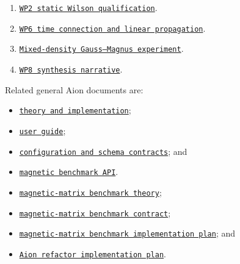 \documentclass[11pt]{article}
\newcommand{\filelink}[2]{\href{run:#2}{\texttt{#1}}}
\begin{document}
\begin{enumerate}
  \item \filelink{WP2 static Wilson qualification}{/home/cgs/00_WORK/Projection_Code/aion-magnetic-matrix-benchmark/docs/exact_one_electron_wp2_static_wilson_qualification.md}.
  \item \filelink{WP6 time connection and linear propagation}{/home/cgs/00_WORK/Projection_Code/aion-magnetic-matrix-benchmark/docs/exact_one_electron_wp6_time_connection_linear_propagation.md}.
  \item \filelink{Mixed-density Gauss--Magnus experiment}{/home/cgs/00_WORK/Projection_Code/aion-magnetic-matrix-benchmark/docs/experimental_wp6_mixed_density_magnus.md}.
  \item \filelink{WP8 synthesis narrative}{/home/cgs/00_WORK/Projection_Code/CALCULATIONS/campaigns/exact_one_electron_qualification/wp8_synthesis_20260919T152644Z_2fa0214fa659/synthesis.md}.
\end{enumerate}

Related general Aion documents are:
\begin{itemize}
  \item \filelink{theory and implementation}{/home/cgs/00_WORK/Projection_Code/aion-magnetic-matrix-benchmark/docs/theory_and_implementation.tex};
  \item \filelink{user guide}{/home/cgs/00_WORK/Projection_Code/aion-magnetic-matrix-benchmark/docs/user_guide.md};
  \item \filelink{configuration and schema contracts}{/home/cgs/00_WORK/Projection_Code/aion-magnetic-matrix-benchmark/docs/configuration_and_schema_contracts.md}; and
  \item \filelink{magnetic benchmark API}{/home/cgs/00_WORK/Projection_Code/aion-magnetic-matrix-benchmark/docs/magnetic_benchmark_api.md}.
  \item \filelink{magnetic-matrix benchmark theory}{/home/cgs/00_WORK/Projection_Code/aion-magnetic-matrix-benchmark/docs/magnetic_matrix_benchmark_theory.tex};
  \item \filelink{magnetic-matrix benchmark contract}{/home/cgs/00_WORK/Projection_Code/aion-magnetic-matrix-benchmark/docs/magnetic_matrix_benchmark_contract.md};
  \item \filelink{magnetic-matrix benchmark implementation plan}{/home/cgs/00_WORK/Projection_Code/aion-magnetic-matrix-benchmark/docs/magnetic_matrix_benchmark_implementation_plan.md}; and
  \item \filelink{Aion refactor implementation plan}{/home/cgs/00_WORK/Projection_Code/aion-magnetic-matrix-benchmark/docs/refactor_implementation_plan.md}.
\end{itemize}
\end{document}
